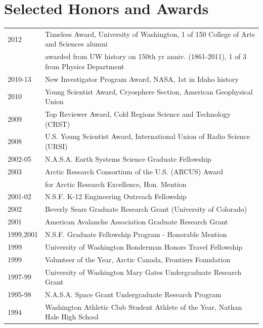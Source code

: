 \documentclass[11pt]{article}
\begin{document}
\section*{Selected Honors and Awards}
\begin{tabular}{ll}
2012 & Timeless Award, University of Washington, 1 of 150 College of Arts and Sciences alumni  \\
& awarded from UW history on 150th yr anniv. (1861-2011), 1 of 3 from Physics Department \\
2010-13 & New Investigator Program Award, NASA, 1st in Idaho history \\
2010 & Young Scientist Award, Cryosphere Section, American Geophysical Union \\
2009 & Top Reviewer Award, Cold Regions Science and Technology (CRST) \\
2008 & U.S. Young Scientist Award, International Union of Radio Science (URSI) \\
2002-05 & N.A.S.A. Earth Systems Science Graduate Fellowship \\
2003 & Arctic Research Consortium of the U.S. (ARCUS) Award \\
& for Arctic Research Excellence, Hon. Mention \\
2001-02 & N.S.F. K-12 Engineering Outreach Fellowship \\
2002 & Beverly Sears Graduate Research Grant (University of Colorado) \\
2001 & American Avalanche Association Graduate Research Grant \\
1999,2001 & N.S.F. Graduate Fellowship Program - Honorable Mention \\
1999 & University of Washington Bonderman Honors Travel Fellowship \\
1999 & Volunteer of the Year, Arctic Canada, Frontiers Foundation \\
1997-99 & University of Washington Mary Gates Undergraduate Research Grant \\
1995-98 & N.A.S.A. Space Grant Undergraduate Research Program \\
1994 & Washington Athletic Club Student Athlete of the Year, Nathan Hale High School \\
\end{tabular}
\end{document}
